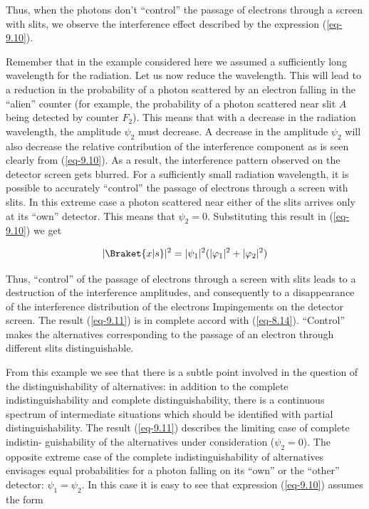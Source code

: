 \documentclass[a4paper,sfsidenotes,colorlinks=true]{tufte-book}
\numberwithin{equation}{section}
\numberwithin{figure}{section}
\begin{document}
Thus, when the photons don't ``control'' the passage of electrons
through a screen with slits, we observe the interference effect
described by the expression (\ref{eq-9.10}). 

Remember that in the example considered here we assumed a sufficiently
long wavelength for the radiation. Let us now reduce the
wavelength. This will lead to a reduction in the probability of a
photon scattered by an electron falling in the ``alien'' counter (for
example, the probability of a photon scattered near slit $A$ being
detected by counter $F_{2}$). This means that with a decrease in the
radiation wavelength, the amplitude $\psi_{2}$ must decrease. A
decrease in the amplitude $\psi_{2}$ will also decrease the relative
contribution of the interference component as is seen clearly from
(\ref{eq-9.10}). As a result, the interference pattern observed on the detector
screen gets blurred. For a sufficiently small radiation wavelength, it
is possible to accurately ``control'' the passage of electrons through
a screen with slits. In this extreme case a photon scattered near
either of the slits arrives only at its ``own'' detector. This means
that $\psi_{2} = 0$. Substituting this result in (\ref{eq-9.10}) we get

\begin{equation}%
|\Braket{x|s}|^{2} = |\psi_{1}|^{2}  (|\varphi_{1}|^{2}+|\varphi_{2}|^{2}) 
\label{eq-9.11}
\end{equation}

Thus, ``control'' of the passage of electrons through a screen with slits leads to a destruction of the interference amplitudes, and consequently to a disappearance of the interference distribution of the electrons Impingements on the detector screen. The result (\ref{eq-9.11}) is in complete accord with (\ref{eq-8.14}). ``Control'' makes the alternatives corresponding to the passage of an electron through different slits distinguishable.


From this example we see that there is a subtle point involved in the
question of the distinguishability of alternatives: in addition to the
complete indistinguishability and complete distinguishability, there
is a continuous spectrum of intermediate situations which should be
identified with partial distinguishability. The result (\ref{eq-9.11})
describes the limiting case of complete indistin- guishability of the
alternatives under consideration ($\psi_{2} =0$). The opposite extreme case
of the complete indistinguishability of alternatives envisages equal
probabilities for a photon falling on its ``own'' or the ``other''
detector: $\psi_{1} = \psi_{2}$. In this case it is easy to see that expression
(\ref{eq-9.10}) assumes the form
\end{document}
